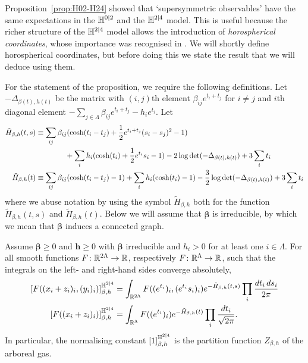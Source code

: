 \documentclass[11pt]{amsart}
\numberwithin{equation}{section}
\numberwithin{theorem}{section}
\newcommand{\cb}[1]{\left[#1\right ]} %
\newcommand{\V}[1]{\boldsymbol{#1}}
\begin{document}
Proposition~\ref{prop:H02-H24} showed that `supersymmetric
observables' have the same expectations in the $\mathbb{H}^{0|2}$ and the
$\mathbb{H}^{2|4}$ model. This is useful because the richer structure
of the $\mathbb{H}^{2|4}$ model allows the introduction of
\emph{horospherical coordinates}, whose importance was recognised in
\cite{MR2104878,MR2728731}.  We will shortly define horospherical
coordinates, but before doing this we
state the result that we will deduce using them.

For the statement of the proposition, we require the following definitions.
Let $-\Delta_{\beta(t),h(t)}$ be the matrix with $(i,j)$th element
$\beta_{ij}e^{t_{i}+t_{j}}$ for $i\neq j$ and $i$th diagonal
element $-\sum_{j\in\Lambda}\beta_{ij}e^{t_{i}+t_{j}}-h_{i}e^{t_{i}}$. Let
\begin{align}
  \label{eq:horo-interact}
  \tilde H_{\beta,h}(t,s)
  &\equiv \sum_{ij}\beta_{ij}(\cosh(t_{i}-t_{j})+\frac12 e^{t_i+t_j}(s_i-s_j)^2-1)
    \nonumber\\ &\qquad\qquad + \sum_{i}h_{i}(\cosh(t_{i})+\frac12 e^{t_i}s_i-1) - 2\log \det (-\Delta_{\beta(t),h(t)}) + 3\sum_i t_i
  \\
  \tilde H_{\beta,h}(t)
  &\equiv \sum_{ij}\beta_{ij}(\cosh(t_{i}-t_{j})-1) + \sum_{i}h_{i}(\cosh(t_{i})-1) - \frac{3}{2}\log \det (-\Delta_{\beta(t),h(t)}) + 3 \sum_i t_i
\end{align}
where we abuse notation by using the symbol $\tilde H_{\beta,h}$ both
for the function $\tilde H_{\beta,h}(t,s)$ and
$\tilde H_{\beta,h}(t)$.  Below we will assume that $\V{\beta}$ is
irreducible, by which we mean that $\V{\beta}$ induces a connected graph.

\begin{proposition} 
  \label{prop:H24-horo} 
  Assume $\V{\beta} \geq 0$ and $\V{h} \geq 0$ with $\V{\beta}$
  irreducible and $h_i>0$ for at least one $i\in\Lambda$.  For all
  smooth functions $F\colon \mathbb{R}^{2\Lambda} \to \mathbb{R}$, respectively
  $F\colon \mathbb{R}^\Lambda \to \mathbb{R}$, such that the integrals on the left-
  and right-hand sides converge absolutely,
 \begin{align} 
    \label{e:H24-horo-ts}
    \cb{ F((x_i+z_i)_{i}, (y_i)_i)}_{\beta,h}^{\HH^{2|4}}
    &=
    \int_{\R^{2\Lambda}} F((e^{t_i})_{i}, (e^{t_i}s_i)_i) e^{-\tilde H_{\beta,h}(t,s)} \prod_{i} \frac{dt_i\, ds_i}{2\pi}
    \\
    \label{e:H24-horo-t}
    \cb{ F((x_{i}+z_i)_{i})}_{\beta,h}^{\HH^{2|4}}
    &=
    \int_{\R^{\Lambda}} F((e^{t_i})_{i}) e^{-\tilde H_{\beta,h}(t)} \prod_{i} \frac{dt_i}{\sqrt{2\pi}}.
  \end{align}
  In particular, the normalising constant
  $\cb{1}_{\beta,h}^{\HH^{2|4}}$ is the partition function
  $Z_{\beta,h}$ of the arboreal gas.
\end{proposition}
\end{document}
